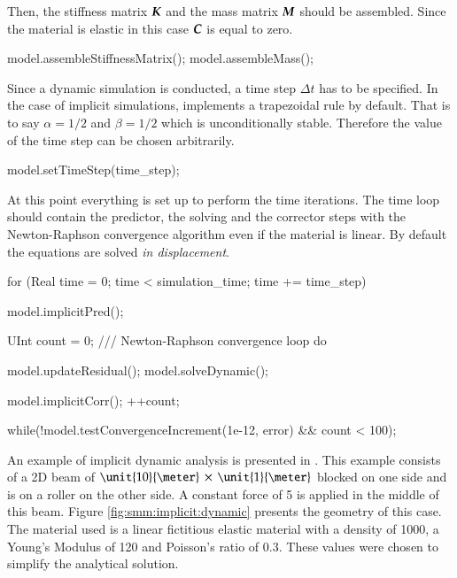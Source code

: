 Then, the  stiffness matrix  $\boldsymbol{K}$ and the  mass matrix $\boldsymbol{M}$  should be
assembled.  Since  the material is  elastic in this  case $\boldsymbol{C}$ is  equal to
zero.
\begin{cpp}
  model.assembleStiffnessMatrix();
  model.assembleMass();
\end{cpp}

Since  a dynamic  simulation is  conducted, a  time step  $\Delta t$  has  to be
specified. In the case of  implicit simulations, \akantu implements a trapezoidal
rule by  default.  That  is to say  $\alpha =  1/2$ and $\beta  = 1/2$  which is
unconditionally  stable. Therefore  the value  of the  time step  can  be chosen
arbitrarily.  
\begin{cpp}
  model.setTimeStep(time_step);
\end{cpp}

At this point everything is set up to perform the time iterations. The time loop
should  contain the  predictor, the  solving and  the corrector  steps  with the
Newton-Raphson convergence algorithm even if the material is linear.  By default
the        equations       are       solved        \emph{in       displacement}.
\begin{cpp}
  for (Real time = 0; time < simulation_time; time += time_step) {
    model.implicitPred();

    UInt count = 0;
    /// Newton-Raphson convergence loop
    do {
      model.updateResidual();
      model.solveDynamic();

      model.implicitCorr();
      ++count;
    } while(!model.testConvergenceIncrement(1e-12, error) && count < 100);
  }
\end{cpp}



An    example    of    implicit     dynamic    analysis    is    presented    in
.  This example  consists of a 2D beam
of $\unit{10}{\meter}\,\times\,\unit{1}{\meter}$ blocked on one side and is on a
roller on the other side.  A constant force of \unit{5}{\kilo\newton} is applied
in the middle of  this beam.  Figure \ref{fig:smm:implicit:dynamic} presents the
geometry of this case. The material used is a linear fictitious elastic material
with  a density  of  \unit{1000}{\kilogrampercubicmetre}, a  Young's Modulus  of
\unit{120}{\mega\pascal} and Poisson's ratio  of $0.3$. These values were chosen
to simplify the analytical solution.

